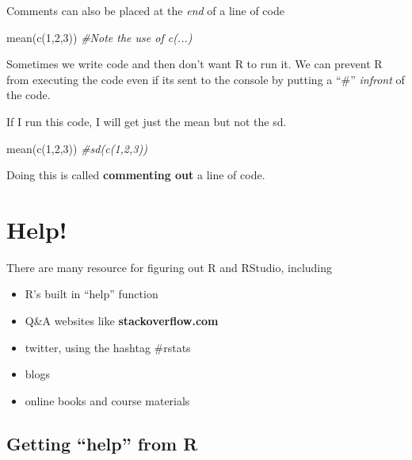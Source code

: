 \documentclass[
]{book}
\newenvironment{Shaded}{\begin{snugshade}}{\end{snugshade}}
\newcommand{\CommentTok}[1]{\textcolor[rgb]{0.56,0.35,0.01}{\textit{#1}}}
\newcommand{\DecValTok}[1]{\textcolor[rgb]{0.00,0.00,0.81}{#1}}
\newcommand{\FunctionTok}[1]{\textcolor[rgb]{0.00,0.00,0.00}{#1}}
\newcommand{\NormalTok}[1]{#1}
\providecommand{\tightlist}{%
  \setlength{\itemsep}{0pt}\setlength{\parskip}{0pt}}
\begin{document}
Comments can also be placed at the \emph{end} of a line of code

\begin{Shaded}
\begin{Highlighting}[]
\FunctionTok{mean}\NormalTok{(}\FunctionTok{c}\NormalTok{(}\DecValTok{1}\NormalTok{,}\DecValTok{2}\NormalTok{,}\DecValTok{3}\NormalTok{)) }\CommentTok{\#Note  the use of c(...)}
\end{Highlighting}
\end{Shaded}

Sometimes we write code and then don't want R to run it. We can prevent R from executing the code even if its sent to the console by putting a ``\#'' \emph{infront} of the code.

If I run this code, I will get just the mean but not the sd.

\begin{Shaded}
\begin{Highlighting}[]
\FunctionTok{mean}\NormalTok{(}\FunctionTok{c}\NormalTok{(}\DecValTok{1}\NormalTok{,}\DecValTok{2}\NormalTok{,}\DecValTok{3}\NormalTok{))}
\CommentTok{\#sd(c(1,2,3))}
\end{Highlighting}
\end{Shaded}

Doing this is called \textbf{commenting out} a line of code.

\hypertarget{help}{%
\section{Help!}\label{help}}

There are many resource for figuring out R and RStudio, including

\begin{itemize}
\tightlist
\item
  R's built in ``help'' function
\item
  Q\&A websites like \textbf{stackoverflow.com}
\item
  twitter, using the hashtag \#rstats
\item
  blogs
\item
  online books and course materials
\end{itemize}

\hypertarget{getting-help-from-r}{%
\subsection{Getting ``help'' from R}\label{getting-help-from-r}}
\end{document}
